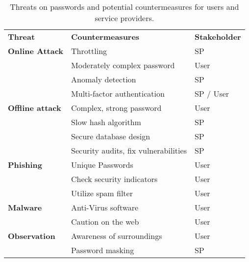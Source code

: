 \begin{table}[htbp]
  \centering
  \caption{\label{table:rw:attacks_countermeasures}Threats on passwords and potential countermeasures for users and service providers.}
    \begin{tabular}{rll}
    \multicolumn{1}{l}{\textbf{Threat}} & \textbf{Countermeasures} & \textbf{Stakeholder} \\
    \multicolumn{1}{l}{\textbf{Online Attack}} & Throttling & SP \\
          & Moderately complex password & User \\
          & Anomaly detection & SP \\
          & Multi-factor authentication & SP / User \\
    \multicolumn{1}{l}{\textbf{Offline attack}} & Complex, strong password & User \\
          & Slow hash algorithm & SP \\
          & Secure database design & SP \\
          & Security audits, fix vulnerabilities & SP \\
    \multicolumn{1}{l}{\textbf{Phishing}} & Unique Passwords & User \\
          & Check security indicators & User \\
          & Utilize spam filter & User \\
    \multicolumn{1}{l}{\textbf{Malware}} & Anti-Virus software & User \\
          & Caution on the web & User \\
    \multicolumn{1}{l}{\textbf{Observation}} & Awareness of surroundings & User \\
          & Password masking & SP \\
    \end{tabular}%
\end{table}%